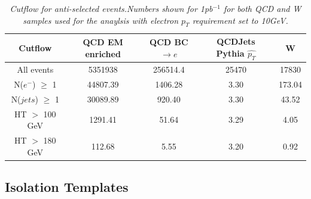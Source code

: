 \begin{table}[h!]
\begin{center}
\begin{tabular}{|c||c|c|c|c|}
\hline
Cutflow & QCD EM enriched & QCD BC$\rightarrow e$ & QCDJets Pythia $\hat{p_{T}}$ &  W \\
\hline
All events & 5351938 & 256514.4 & 25470 & 17830\\
N($e^{-}$) $\geq$ 1 & 44807.39 & 1406.28 & 3.30 & 173.04\\
N($jets$) $\geq$ 1 & 30089.89 & 920.40 & 3.30 & 43.52\\
HT $>$ 100 GeV & 1291.41 & 51.64 & 3.29 & 4.05\\
HT $>$ 180 GeV & 112.68 & 5.55 & 3.20 &  0.92\\
\hline
\end{tabular}
\end{center}
\caption{\textit{Cutflow for anti-selected events.Numbers shown for 1pb$^{-1}$ for both QCD and W samples used for the anaylsis with electron $p_{T}$ requirement set to 10GeV.}}
\label{tab:CF_AS_10}
\end{table}


\subsection{Isolation Templates}
